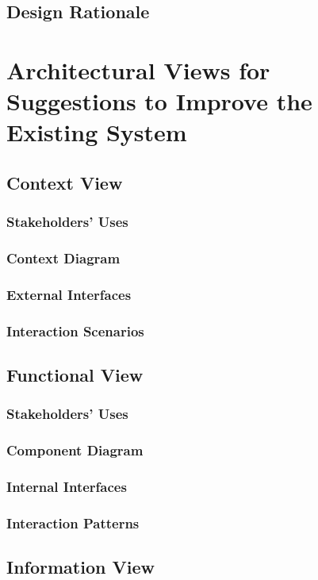 \documentclass[a4paper]{article}
\begin{document}
    \subsection{Design Rationale}
    \lipsum[1-1]

    \section{Architectural Views for Suggestions to Improve the Existing System}
    \subsection{Context View}
    \subsubsection{Stakeholders' Uses}
    \lipsum[1-1]
    \subsubsection{Context Diagram}
    \subsubsection{External Interfaces}
    \lipsum[1-1]
    \subsubsection{Interaction Scenarios}
    \lipsum[1-1]
    \subsection{Functional View}
    \subsubsection{Stakeholders' Uses}
    \lipsum[1-1]
    \subsubsection{Component Diagram}
    \subsubsection{Internal Interfaces}
    \lipsum[1-1]
    \subsubsection{Interaction Patterns}
    \lipsum[1-1]
    \subsection{Information View}
\end{document}
